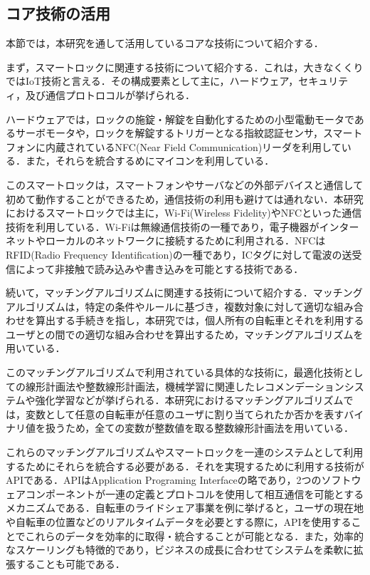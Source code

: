   \subsection{コア技術の活用}
    \label{sec:コア技術の活用}
      \par 本節では，本研究を通して活用しているコアな技術について紹介する．
      \par まず，スマートロックに関連する技術について紹介する．これは，大きなくくりではIoT技術と言える．その構成要素として主に，ハードウェア，セキュリティ，及び通信プロトロコルが挙げられる．
      \par ハードウェアでは，ロックの施錠・解錠を自動化するための小型電動モータであるサーボモータや，ロックを解錠するトリガーとなる指紋認証センサ，スマートフォンに内蔵されているNFC(Near Field Communication)リーダを利用している．また，それらを統合するめにマイコンを利用している．
      \par このスマートロックは，スマートフォンやサーバなどの外部デバイスと通信して初めて動作することができるため，通信技術の利用も避けては通れない．本研究におけるスマートロックでは主に，Wi-Fi(Wireless Fidelity)やNFCといった通信技術を利用している．Wi-Fiは無線通信技術の一種であり，電子機器がインターネットやローカルのネットワークに接続するために利用される．NFCはRFID(Radio Frequency Identification)の一種であり，ICタグに対して電波の送受信によって非接触で読み込みや書き込みを可能とする技術である．
      \par 続いて，マッチングアルゴリズムに関連する技術について紹介する．マッチングアルゴリズムは，特定の条件やルールに基づき，複数対象に対して適切な組み合わせを算出する手続きを指し，本研究では，個人所有の自転車とそれを利用するユーザとの間での適切な組み合わせを算出するため，マッチングアルゴリズムを用いている．
      \par このマッチングアルゴリズムで利用されている具体的な技術に，最適化技術としての線形計画法や整数線形計画法，機械学習に関連したレコメンデーションシステムや強化学習などが挙げられる．本研究におけるマッチングアルゴリズムでは，変数として任意の自転車が任意のユーザに割り当てられたか否かを表すバイナリ値を扱うため，全ての変数が整数値を取る整数線形計画法を用いている．
      \par これらのマッチングアルゴリズムやスマートロックを一連のシステムとして利用するためにそれらを統合する必要がある．それを実現するために利用する技術がAPIである．APIはApplication Programing Interfaceの略であり，2つのソフトウェアコンポーネントが一連の定義とプロトコルを使用して相互通信を可能とするメカニズムである．自転車のライドシェア事業を例に挙げると，ユーザの現在地や自転車の位置などのリアルタイムデータを必要とする際に，APIを使用することでこれらのデータを効率的に取得・統合することが可能となる．また，効率的なスケーリングも特徴的であり，ビジネスの成長に合わせてシステムを柔軟に拡張することも可能である．

